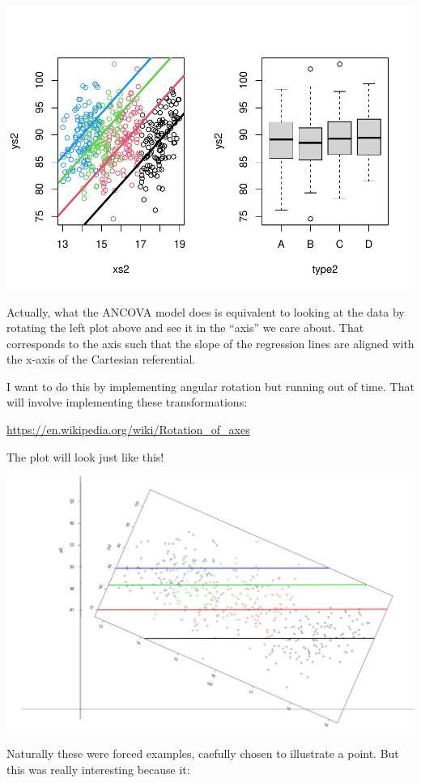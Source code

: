 \documentclass[
]{book}
\begin{document}
\includegraphics{ECOMODbook_files/figure-latex/a10.15-1.pdf}

Actually, what the ANCOVA model does is equivalent to looking at the data by rotating the left plot above and see it in the ``axis'' we care about. That corresponds to the axis such that the slope of the regression lines are aligned with the x-axis of the Cartesian referential.

I want to do this by implementing angular rotation but running out of time. That will involve implementing these transformations:

\url{https://en.wikipedia.org/wiki/Rotation_of_axes}

The plot will look just like this!

\includegraphics{FigPlotRotatedAula10.JPG}

Naturally these were forced examples, caefully chosen to illustrate a point. But this was really interesting because it:
\end{document}
